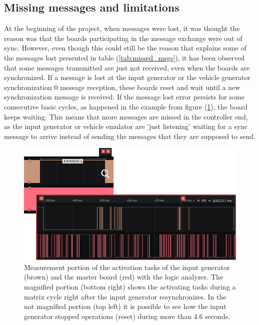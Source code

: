 \documentclass[table,xcdraw]{article}
\begin{document}
\subsection{Missing messages and limitations}
At the beginning of the project, when messages were lost, it was thought the reason was that the boards participating in the message exchange were out of sync. However, even though this could still be the reason that explains some of the messages lost presented in table (\ref{tab:missed_msgs}), it has been observed that some messages transmitted are just not received, even when the boards are synchronized. If a message is lost at the input generator or the vehicle generator synchronization 0 message reception, these boards reset and wait until a new synchronization message is received. If the message lost error persists for some consecutive basic cycles, as happened in the example from figure (\ref{fig:input_get_missed_msgs}), the board keeps waiting. This means that more messages are missed in the controller end, as the input generator or vehicle emulator are 'just listening' waiting for a sync message to arrive instead of sending the messages that they are supposed to send.\\

\begin{figure}[h!]
    \centering
    \includegraphics[scale=0.45]{figures/discussion/input_gen_missed_msgs.jpg}
    \caption{Measurement portion of the activation tasks of the input generator (brown) and the master board (red) with the logic analyzer. The magnified portion (bottom right) shows the activating tasks during a matrix cycle right after the input generator resynchronizes. In the not magnified portion (top left) it is possible to see how the input generator stopped operations (reset) during more than 4.6 seconds.}
    \label{fig:input_get_missed_msgs}
\end{figure}
\end{document}
